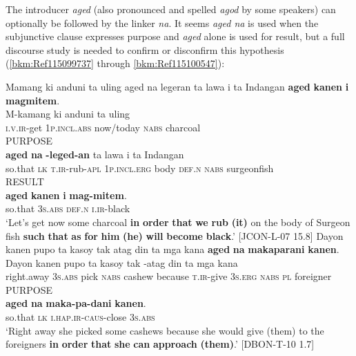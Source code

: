 The introducer \textit{aged} (also pronounced and spelled \textit{agod} by some speakers) can optionally be followed by the linker \textit{na}. It seems \textit{aged na} is used when the subjunctive clause expresses purpose and \textit{aged} alone is used for result, but a full discourse study is needed to confirm or disconfirm this hypothesis (\ref{bkm:Ref115099737} through \ref{bkm:Ref115100547}):

\ea
\label{bkm:Ref115099737}
Mamang  ki  anduni  ta  uling  aged  na  legeran ta  lawa  i  ta  Indangan  \textbf{aged}  \textbf{kanen}  \textbf{i}  \textbf{magmitem}. \smallskip\\

\gll M-kamang  ki  anduni ta  uling   \\
\textsc{i.v.ir}-get  1\textsc{p.incl.abs}  now/today \textsc{nabs}  charcoal\\
 PURPOSE \\
\gll \textbf{aged}  \textbf{na}  \emptyset{}\textbf{-leged-an} ta  lawa  i  ta  Indangan \\
  so.that  \textsc{lk}  \textsc{t.ir}-rub-\textsc{apl} 1\textsc{p.incl.erg}  body  \textsc{def.n}  \textsc{nabs}  surgeonfish \\

RESULT \\
\gll \textbf{aged}  \textbf{kanen}  \textbf{i}  \textbf{mag-mitem}. \\
so.that  3\textsc{s.abs}  \textsc{def.n}  \textsc{i.ir}-black \\
\glt `Let’s get now some charcoal \textbf{in} \textbf{order} \textbf{that} \textbf{we} \textbf{rub} \textbf{(it)} on the body of Surgeon fish \textbf{such} \textbf{that} \textbf{as} \textbf{for} \textbf{him} \textbf{(he)} \textbf{will} \textbf{become} \textbf{black}.’ [JCON-L-07 15.8]
\z
\ea
Dayon  kanen  pupo  ta  kasoy  tak  atag  din  ta  mga  kana \textbf{aged}  \textbf{na}  \textbf{makaparani}  \textbf{kanen}. \smallskip\\
\gll Dayon  kanen  pupo  ta  kasoy  tak  \emptyset{}-atag  din  ta  mga  kana \\
right.away  3\textsc{s.abs}  pick  \textsc{nabs}  cashew  because  \textsc{t.ir}-give  3\textsc{s.erg}  \textsc{nabs}  \textsc{pl}  foreigner \\

PURPOSE \\
\gll \textbf{aged}  \textbf{na}  \textbf{maka-pa-dani}  \textbf{kanen}. \\
so.that  \textsc{lk}  \textsc{i.hap.ir}-\textsc{caus}-close  3\textsc{s.abs} \\
\glt `Right away she picked some cashews because she would give (them) to the foreigners \textbf{in} \textbf{order} \textbf{that} \textbf{she} \textbf{can} \textbf{approach} \textbf{(them)}.’ [DBON-T-10 1.7]
\z

